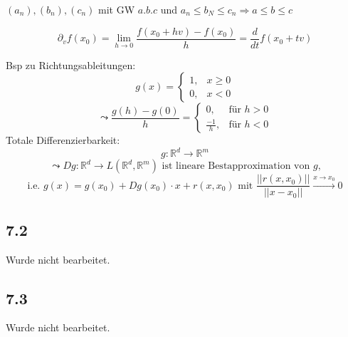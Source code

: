 \documentclass[
    accentcolor=pink,
    boxarc,
    dark_mode,
    logofile=enmpty
]{rubos-tuda-template}
\begin{document}
    $(a_n),(b_n),(c_n)$ mit GW $a.b.c$ und $a_n \le b_N \le c_n \Rightarrow a \le b \le c$

    \[\partial_vf(x_0) = \lim_{h \to 0} \frac{f(x_0+hv)-f(x_0)}{h} = \frac{d}{dt} f(x_0+tv)\]

    Bsp zu Richtungsableitungen:
    \[g(x) = \begin{cases}
            1, & x \ge 0 \\
            0, & x < 0
        \end{cases}\]
    \[\leadsto \frac{g(h)- g(0)}{h} = \begin{cases}
            0,            & \text{für } h > 0 \\
            \frac{-1}{h}, & \text{für } h < 0
        \end{cases}\]
    Totale Differenzierbarkeit:
    \[g: \mathbb{R}^d \to \mathbb{R}^m\]
    \[\leadsto Dg: \mathbb{R}^d \to L(\mathbb{R}^d, \mathbb{R}^m) \text{ ist lineare Bestapproximation von $g$,}\]
    \[\text{i.e. } g(x) = g(x_0) + Dg(x_0) \cdot x + r(x,x_0) \text{ mit } \frac{||r(x,x_0)||}{||x-x_0||} \overset{x \to x_0}{\rightarrow} 0\]

    \subsection*{7.2}
    \begin{anmerkung}
        Wurde nicht bearbeitet.
    \end{anmerkung}

    \subsection*{7.3}
    \begin{anmerkung}
        Wurde nicht bearbeitet.
    \end{anmerkung}
\end{document}

